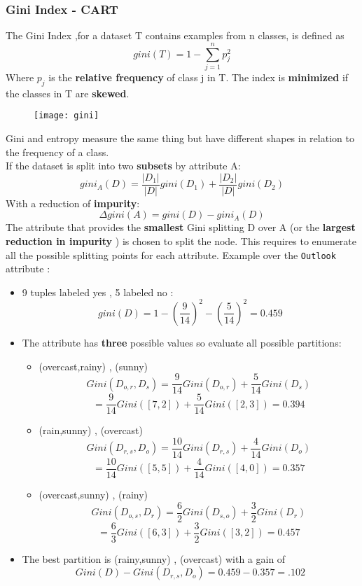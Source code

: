 \subsubsection{Gini Index - CART}
The Gini Index ,for a dataset T contains examples from n classes, is defined as 
$$ gini(T) = 1 - \sum \limits_{j=1}^{n}p^2_j$$
Where $p_j$ is the \textbf{relative frequency} of class j in T. The index is \textbf{minimized} if the classes in T are \textbf{skewed}.
\begin{figure}[H]
  \centering
  \texttt{[image: gini]}
\end{figure}
Gini and entropy measure the same thing but have different shapes in relation to the frequency of a class.\\
If the dataset is split into two \textbf{subsets} by attribute A:
$$ gini_A(D) = \frac{|D_1|}{|D|} gini(D_1) + \frac{|D_2|}{|D|}gini(D_2)$$
With a reduction of \textbf{impurity}: 
$$ \Delta gini(A) = gini(D) - gini_A(D)$$
The attribute that provides the \textbf{smallest} Gini splitting D over A (or the \textbf{largest reduction in impurity} ) is chosen to split the node. This requires to enumerate all the possible splitting points for each attribute.
Example over the \texttt{Outlook} attribute :
\begin{itemize}
\item 9 tuples labeled yes , 5 labeled no :
$$ gini(D) = 1- \left( \frac{9}{14} \right)^2 - \left( \frac{5}{14} \right)^2 = 0.459$$
\item The attribute has \textbf{three} possible values so evaluate all possible partitions:
\begin{itemize}
\item (overcast,rainy) , (sunny)
$$ Gini(D_{o,r}, D_s)= \frac{9}{14}Gini(D_{o,r})+\frac{5}{14}Gini(D_s)$$
$$ = \frac{9}{14}Gini([7,2]) + \frac{5}{14}Gini([2,3]) =0.394$$
\item (rain,sunny) , (overcast)
$$ Gini(D_{r,s}, D_o)= \frac{10}{14}Gini(D_{r,s})+\frac{4}{14}Gini(D_o)$$
$$ = \frac{10}{14}Gini([5,5]) + \frac{4}{14}Gini([4,0]) =0.357$$
\item (overcast,sunny) , (rainy)
$$ Gini(D_{o,s}, D_r)= \frac{6}{2}Gini(D_{s,o})+\frac{3}{2}Gini(D_r)$$
$$ = \frac{6}{3}Gini([6,3]) + \frac{3}{2}Gini([3,2]) =0.457$$
\end{itemize}

\item The best partition is (rainy,sunny) , (overcast) with a gain of 
$$ Gini(D) - Gini(D_{r,s},D_o) =0.459 - 0.357 = .102 $$
\end{itemize}

